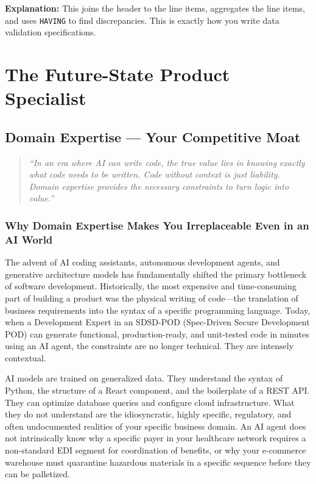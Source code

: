 \textbf{Explanation:} This joins the header to the line items,
aggregates the line items, and uses \texttt{HAVING} to find
discrepancies. This is exactly how you write data validation
specifications.

\part{The Future-State Product Specialist}

\chapter{Domain Expertise --- Your Competitive
Moat}\label{domain-expertise-your-competitive-moat}

\begin{quote}
\emph{``In an era where AI can write code, the true value lies in
knowing exactly what code needs to be written. Code without context is
just liability. Domain expertise provides the necessary constraints to
turn logic into value.''}
\end{quote}

\section{Why Domain Expertise Makes You Irreplaceable Even in an AI
World}\label{why-domain-expertise-makes-you-irreplaceable-even-in-an-ai-world}

The advent of AI coding assistants, autonomous development agents, and
generative architecture models has fundamentally shifted the primary
bottleneck of software development. Historically, the most expensive and
time-consuming part of building a product was the physical writing of
code---the translation of business requirements into the syntax of a
specific programming language. Today, when a Development Expert in an
SDSD-POD (Spec-Driven Secure Development POD) can generate functional,
production-ready, and unit-tested code in minutes using an AI agent, the
constraints are no longer technical. They are intensely contextual.

AI models are trained on generalized data. They understand the syntax of
Python, the structure of a React component, and the boilerplate of a
REST API. They can optimize database queries and configure cloud
infrastructure. What they do not understand are the idiosyncratic,
highly specific, regulatory, and often undocumented realities of your
specific business domain. An AI agent does not intrinsically know why a
specific payer in your healthcare network requires a non-standard EDI
segment for coordination of benefits, or why your e-commerce warehouse
must quarantine hazardous materials in a specific sequence before they
can be palletized.

